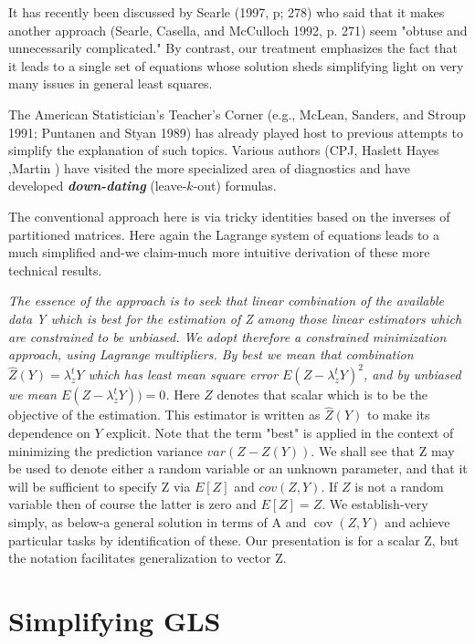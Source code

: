 \documentclass[12pt, a4paper]{article}
\begin{document}
It has recently been discussed by Searle (1997, p; 278) who said that it makes another approach (Searle, Casella, and McCulloch 1992, p. 271) seem "obtuse and unnecessarily complicated." By contrast, our treatment emphasizes the fact that it leads to a single set of equations whose solution sheds simplifying light on very many issues in general least squares.

The American Statistician's Teacher's Corner (e.g., McLean, Sanders, and Stroup 1991; Puntanen and Styan 1989) has already played host to previous attempts to simplify the explanation of such topics. Various authors (CPJ, Haslett Hayes ,Martin ) have visited the more specialized area of diagnostics and have developed \textbf{\emph{down-dating}} (leave-$k$-out) formulas.

The conventional approach here is via tricky identities based on the inverses of partitioned matrices. Here again the Lagrange system of equations leads to a much simplified and-we claim-much more intuitive derivation of these more technical results.


\emph{
	The essence of the approach is to seek that linear combination of the available data Y which is best for the
	estimation of Z among those linear estimators which are constrained to be unbiased. We adopt therefore a constrained minimization approach, using Lagrange multipliers. By best we mean that combination $\hat{Z}(Y) = \lambda_{z}^{t}Y$ which has least mean square error $E( Z- \lambda_{z}^{t}Y)^2$, and by unbiased we mean $E( Z- \lambda_{z}^{t}Y)) = 0$. }
Here $Z$ denotes that scalar which is to be the objective of the estimation. This estimator is written as $\hat{Z}(Y)$ to make its dependence on $Y$ explicit. Note that the term "best" is applied in the context of minimizing the prediction variance $var(Z - Z(Y))$. We shall see that Z may be used to denote either a random variable or an unknown parameter, and that it will be sufficient to specify Z via $E[Z]$ and $cov(Z, Y)$. If $Z$ is not a random variable then of course the latter is zero and $E[Z] = Z$. We establish-very simply, as below-a general solution in terms of A and $\operatorname{cov}(Z, Y)$ and achieve particular tasks by identification of these. Our presentation is for a scalar Z, but the notation facilitates generalization to vector Z.


\newpage

\section{Simplifying GLS}
\end{document}
